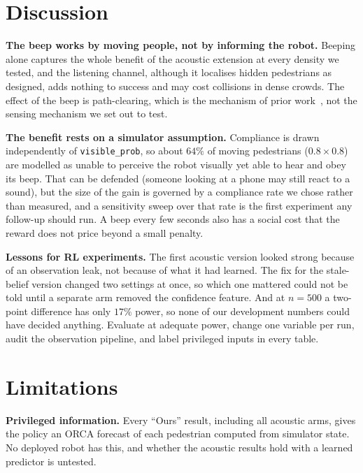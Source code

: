 \documentclass[conference]{IEEEtran}
\begin{document}
\section{Discussion}
\label{sec:discussion}

\textbf{The beep works by moving people, not by informing the robot.} Beeping alone captures
the whole benefit of the acoustic extension at every density we tested, and the listening
channel, although it localises hidden pedestrians as designed, adds nothing to success and may
cost collisions in dense crowds. The effect of the beep is path-clearing, which is the mechanism
of prior work~\cite{l2b}, not the sensing mechanism we set out to test.

\textbf{The benefit rests on a simulator assumption.} Compliance is drawn independently of
\texttt{visible\_prob}, so about $64\%$ of moving pedestrians ($0.8\times0.8$) are modelled as
unable to perceive the robot visually yet able to hear and obey its beep. That can be defended
(someone looking at a phone may still react to a sound), but the size of the gain is governed by
a compliance rate we chose rather than measured, and a sensitivity sweep over that rate is the
first experiment any follow-up should run. A beep every few seconds also has a social cost that
the reward does not price beyond a small penalty.

\textbf{Lessons for RL experiments.} The first acoustic version looked strong because of an
observation leak, not because of what it had learned. The fix for the stale-belief
version changed two settings at once, so which one mattered could not be told until a separate
arm removed the confidence feature. And at $n=500$ a two-point difference has only $17\%$ power, so none of our
development numbers could have decided anything. Evaluate at adequate power, change one variable
per run, audit the observation pipeline, and label privileged inputs in every table.

\section{Limitations}
\label{sec:limitations}

\textbf{Privileged information.} Every ``Ours'' result, including all acoustic arms, gives the
policy an ORCA forecast of each pedestrian computed from simulator state. No deployed robot has
this, and whether the acoustic results hold with a learned predictor is untested.
\end{document}
